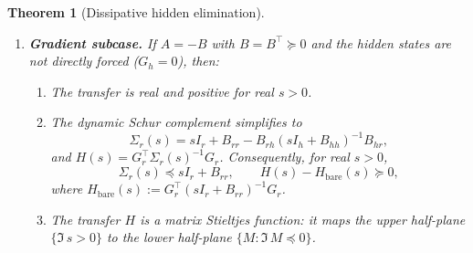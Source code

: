 \documentclass[11pt,a4paper]{article}
\numberwithin{equation}{section}
\theoremstyle{thmcompact}
\newtheorem{theorem}{Theorem}[section]
\theoremstyle{remark}
\begin{document}
\begin{theorem}[Dissipative hidden elimination]
\begin{enumerate}[label=\textup{(\roman*)}]
\item \textbf{Gradient subcase.} If $A = -B$ with $B = B^\top \succeq 0$ and the hidden states are not directly forced ($G_h = 0$), then:
\begin{enumerate}[label=(\alph*)]
\item The transfer is real and positive for real $s > 0$.
\item The dynamic Schur complement simplifies to
\begin{equation}\label{eq:C-gradient-schur}
\Sigma_r(s) = sI_r + B_{rr} - B_{rh}(sI_h + B_{hh})^{-1}B_{hr},
\end{equation}
and $H(s) = G_r^\top \Sigma_r(s)^{-1} G_r$. Consequently, for real $s > 0$,
\begin{equation}\label{eq:C-gradient-order}
\Sigma_r(s) \preceq sI_r + B_{rr}, \qquad H(s) - H_{\mathrm{bare}}(s) \succeq 0,
\end{equation}
where $H_{\mathrm{bare}}(s) := G_r^\top (sI_r + B_{rr})^{-1}G_r$.
\item The transfer $H$ is a matrix Stieltjes function: it maps the upper half-plane $\{\Im\, s > 0\}$ to the lower half-plane $\{M : \Im\, M \preceq 0\}$.
\end{enumerate}
\end{enumerate}
\end{theorem}
\end{document}
